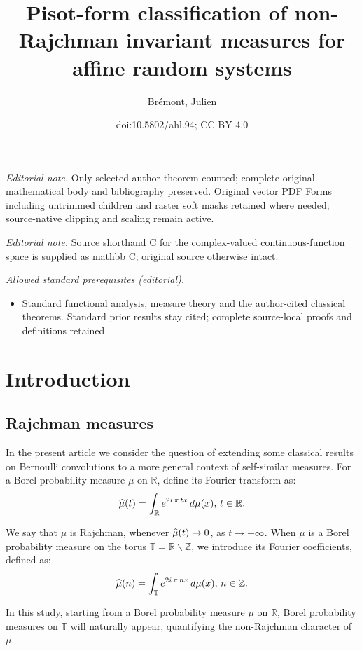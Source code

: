 \documentclass[10pt]{amsart}
\title{Pisot-form classification of non-Rajchman invariant measures for affine random systems}
\author{Brémont, Julien}
\date{doi:10.5802/ahl.94; CC BY 4.0}
\theoremstyle{definition}\newtheorem{defi}[theo]{Definition}\newtheorem{rema}[theo]{Remark}\newtheorem{exam}[theo]{Example}\newtheorem{exem}[theo]{Example}\newtheorem{nota}[theo]{Notation}
\newcommand{\Tbb}{\mathbb T}
\newcommand{\Rbb}{\mathbb R}
\newcommand{\Zbb}{\mathbb Z}
\let\oldhat\hat
\renewcommand*{\hat}[1]{\mathchoice{\widehat{#1}}{\widehat{#1}}{\oldhat{#1}}{\oldhat{#1}}}
\begin{document}
\maketitle
\noindent\textit{Editorial note.} Only selected author theorem counted; complete original mathematical body and bibliography preserved. Original vector PDF Forms including untrimmed children and raster soft masks retained where needed; source-native clipping and scaling remain active.\par\medskip
\noindent\textit{Editorial note.} Source shorthand C for the complex-valued continuous-function space is supplied as mathbb C; original source otherwise intact.\par\medskip
\noindent\textit{Allowed standard prerequisites (editorial).}\begin{itemize}
\item Standard functional analysis, measure theory and the author-cited classical theorems. Standard prior results stay cited; complete source-local proofs and definitions retained.
\end{itemize}\medskip

\section{Introduction}

\subsection{Rajchman measures}
In the present article we consider the question of extending some classical results on Bernoulli convolutions to a more general context of self-similar measures. For a Borel probability measure $\mu$ on $\Rbb$, define its Fourier transform as:
\[
\hat{\mu}(t)=\int_{\Rbb}e^{2i\,\pi\,tx}\,d\mu(x),\,t\in\Rbb.
\]



We say that $\mu$ is Rajchman, whenever $\hat{\mu}(t)\rightarrow0$, as $t\rightarrow+\infty$. When $\mu$ is a Borel probability measure on the torus $\Tbb=\Rbb\backslash\Zbb$, we introduce its Fourier coefficients, defined as:
\[
\hat{\mu}(n)=\int_{\Tbb}e^{2i\,\pi\,nx}\,d\mu(x),\,n\in\Zbb.
\]


In this study, starting from a Borel probability measure $\mu$ on $\Rbb$, Borel probability measures on $\Tbb$ will naturally appear, quantifying the non-Rajchman character of $\mu$.
\end{document}
